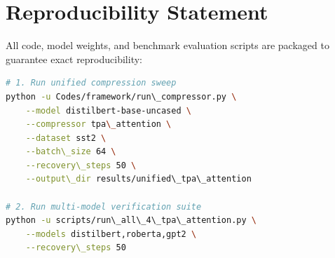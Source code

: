 \section{Reproducibility Statement}
All code, model weights, and benchmark evaluation scripts are packaged to guarantee exact reproducibility:
\begin{lstlisting}[language=bash]
# 1. Run unified compression sweep
python -u Codes/framework/run\_compressor.py \
    --model distilbert-base-uncased \
    --compressor tpa\_attention \
    --dataset sst2 \
    --batch\_size 64 \
    --recovery\_steps 50 \
    --output\_dir results/unified\_tpa\_attention

# 2. Run multi-model verification suite
python -u scripts/run\_all\_4\_tpa\_attention.py \
    --models distilbert,roberta,gpt2 \
    --recovery\_steps 50
\end{lstlisting}
